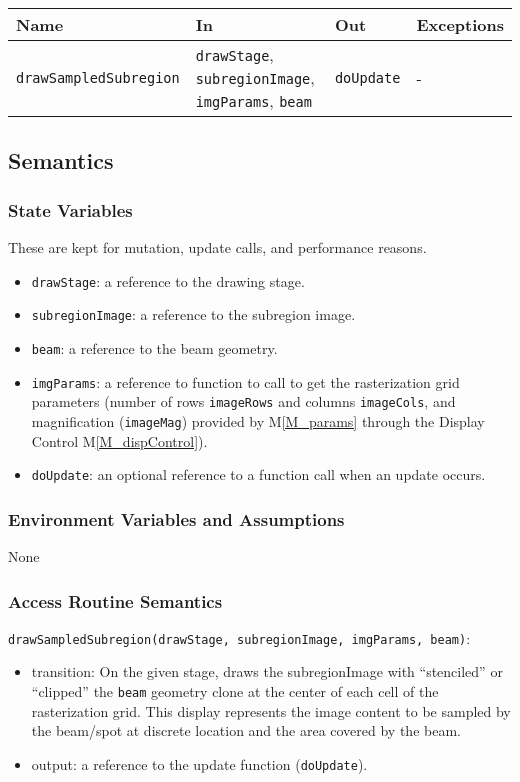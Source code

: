 \documentclass[12pt, titlepage]{article}
\newcommand{\mref}[1]{M\ref{#1}}
\newcommand{\code}[1]{\texttt{#1}}
\begin{document}
\begin{center}
\begin{tabular}{p{5cm} p{4cm} p{4cm} p{2cm}}
\hline
\textbf{Name} & \textbf{In} & \textbf{Out} & \textbf{Exceptions} \\
\hline
\code{drawSampledSubregion} & \code{drawStage}, \code{subregionImage}, \code{imgParams},
  \code{beam} & \code{doUpdate} & - \\
\hline
\end{tabular}
\end{center}

\subsection{Semantics}

\subsubsection{State Variables}
These are kept for mutation, update calls, and performance reasons.
\begin{itemize}
  \item \code{drawStage}: a reference to the drawing stage.
  \item \code{subregionImage}: a reference to the subregion image.
  \item \code{beam}: a reference to the beam geometry.
  \item \code{imgParams}: a reference to function to call to get the rasterization
    grid parameters (number of rows \code{imageRows} and columns \code{imageCols},
    and magnification (\code{imageMag}) 
    provided by \mref{M_params}
    through the Display Control \mref{M_dispControl}).
  \item \code{doUpdate}: an optional reference to a function call when an update occurs.
\end{itemize}

\subsubsection{Environment Variables and Assumptions}
None

\subsubsection{Access Routine Semantics}

\noindent \code{drawSampledSubregion(drawStage, subregionImage, imgParams, beam)}:
\begin{itemize}
\item transition: On the given stage, draws the subregionImage with ``stenciled''
  or ``clipped'' the \code{beam} geometry clone at the center of each cell
  of the rasterization grid. This display represents
  the image content to be sampled by the beam/spot at discrete location
  and the area covered by the beam.
\item output: a reference to the update function (\code{doUpdate}).
\end{itemize}
\end{document}
